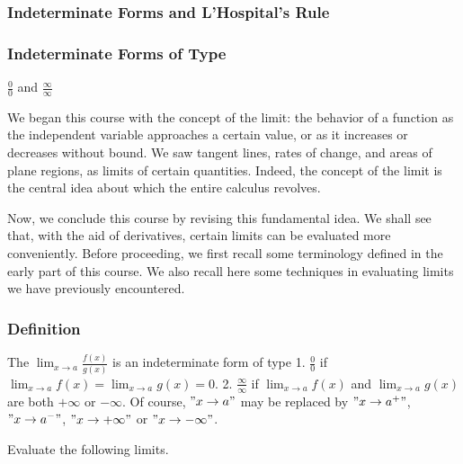 \documentclass[
  letterpaper,
  DIV=11,
  numbers=noendperiod]{scrartcl}
\theoremstyle{plain}
\theoremstyle{remark}
\begin{document}
\hypertarget{indeterminate-forms-and-lhospitals-rule}{%
\subsubsection{Indeterminate Forms and L'Hospital's
Rule}\label{indeterminate-forms-and-lhospitals-rule}}

\hypertarget{htm:Indeterminateforms}{}
\hypertarget{indeterminate-forms-of-type}{%
\subsubsection{Indeterminate Forms of
Type}\label{indeterminate-forms-of-type}}

\(\frac{0}{0}\) and \(\frac{\infty}{\infty}\)

We began this course with the concept of the limit: the behavior of a
function as the independent variable approaches a certain value, or as
it increases or decreases without bound. We saw tangent lines, rates of
change, and areas of plane regions, as limits of certain quantities.
Indeed, the concept of the limit is the central idea about which the
entire calculus revolves.

Now, we conclude this course by revising this fundamental idea. We shall
see that, with the aid of derivatives, certain limits can be evaluated
more conveniently. Before proceeding, we first recall some terminology
defined in the early part of this course. We also recall here some
techniques in evaluating limits we have previously encountered.

\hypertarget{def:Definition}{}
\hypertarget{definition}{%
\subsubsection{Definition}\label{definition}}

The \(\displaystyle\lim_{x \to a} \frac{f(x)}{g(x)}\) is an
indeterminate form of type 1. \(\frac{0}{0}\) if
\(\displaystyle\lim_{x \to a} f(x) = \displaystyle\lim_{x \to a} g(x)=0\).
2. \(\frac{\infty}{\infty}\) if \(\displaystyle\lim_{x \to a} f(x)\) and
\(\displaystyle\lim_{x \to a} g(x)\) are both \(+\infty\) or
\(-\infty\). Of course, \("x \to a"\) may be replaced by
\("x \to a^+"\), \("x \to a^-"\), \("x \to +\infty"\) or
\("x \to -\infty"\).

\leavevmode{}%
Evaluate the following limits.
\end{document}
